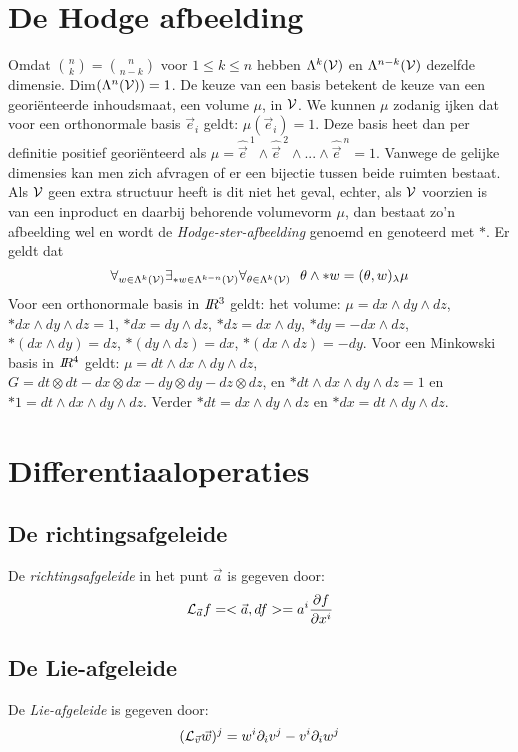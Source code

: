 \section{De Hodge afbeelding}
Omdat ${n\choose k}={n\choose{n-k}}$ voor $1\leq k\leq n$ hebben
$\Lambda^k(\cal V)$ en $\Lambda^{n-k}(\cal V)$ dezelfde dimensie.
Dim$(\Lambda^n({\cal V}))=1$. De keuze van een basis betekent de keuze van een
geori\"enteerde inhoudsmaat, een volume $\mu$, in $\cal V$. We kunnen $\mu$
zodanig ijken dat voor een orthonormale basis $\vec{e}_i$ geldt:
$\mu(\vec{e}_i)=1$. Deze basis heet dan per definitie positief geori\"enteerd
als $\mu=\hat{\vec{e}}^{~1}\wedge \hat{\vec{e}}^{~2}\wedge...\wedge \hat{\vec{e}}^{~n}=1$.
\npar
Vanwege de gelijke dimensies kan men zich afvragen of er een bijectie tussen
beide ruimten bestaat. Als $\cal V$ geen extra structuur heeft is dit niet
het geval, echter, als $\cal V$ voorzien is van een inproduct en daarbij
behorende volumevorm $\mu$, dan bestaat zo'n afbeelding wel en wordt de
{\it Hodge-ster-afbeelding} genoemd en genoteerd met $*$. Er geldt dat
\[
\forall_{w\in\Lambda^k({\cal V})}\exists_{*w\in\Lambda^{k-n}({\cal V})}\forall_{\theta\in\Lambda^k({\cal V})}~~
\theta\wedge*w=(\theta,w)_\lambda\mu
\]
Voor een orthonormale basis in $I\hspace{-1mm}R^3$ geldt: het volume: $\mu=dx\wedge dy\wedge dz$,
$*dx\wedge dy\wedge dz=1$, $*dx=dy\wedge dz$, $*dz=dx\wedge dy$, $*dy=-dx\wedge dz$,
$*(dx\wedge dy)=dz$, $*(dy\wedge dz)=dx$, $*(dx\wedge dz)=-dy$.
\npar
Voor een Minkowski basis in $I\hspace{-1mm}R^4$ geldt: $\mu=dt\wedge dx\wedge dy\wedge dz$,
$G=dt\otimes dt-dx\otimes dx-dy\otimes dy-dz\otimes dz$, en
$*dt\wedge dx\wedge dy\wedge dz=1$ en $*1=dt\wedge dx\wedge dy\wedge dz$. Verder
$*dt=dx\wedge dy\wedge dz$ en $*dx=dt\wedge dy\wedge dz$.

\section{Differentiaaloperaties}
\subsection{De richtingsafgeleide}
De {\it richtingsafgeleide} in het punt $\vec{a}$ is gegeven door:
\[
{\cal L}_{\vec{a}}f=<\vec{a},df>=a^i\frac{\partial f}{\partial x^i}
\]

\subsection{De Lie-afgeleide}
De {\it Lie-afgeleide} is gegeven door:
\[
({\cal L}_{\vec{v}}\vec{w})^j=w^i\partial_iv^j-v^i\partial_iw^j
\]

